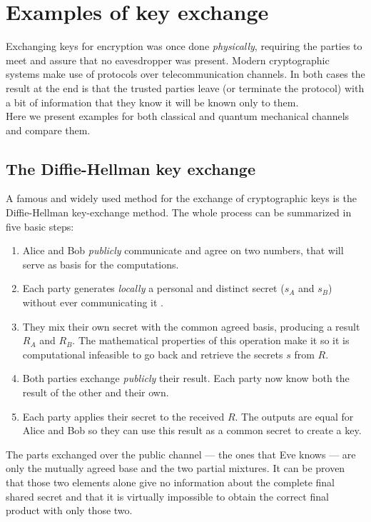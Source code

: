 \section{Examples of key exchange}
	Exchanging keys for encryption was once done \textit{physically}, requiring the parties to meet and assure that no eavesdropper was present.
	Modern cryptographic systems make use of protocols over telecommunication channels. 
	In both cases the result at the end is that the trusted parties leave (or terminate the protocol) with a bit of information that they know it will be known only to them.\\
	Here we present examples for both classical and quantum mechanical channels and compare them.
		\subsection{The Diffie-Hellman key exchange}
	
		A famous and widely used method for the exchange of cryptographic keys is the Diffie-Hellman key-exchange method.
	The whole process can be summarized in five basic steps:
	\begin{enumerate}
		\item Alice and Bob \emph{publicly} communicate and agree on two numbers, that will serve as basis for the computations.
		\item Each party generates \emph{locally} a personal and distinct secret ($s_A$ and $s_B$) without ever communicating it .
		\item They mix their own secret with the common agreed basis, producing a result $R_A$ and $R_B$. The mathematical properties of this operation make it so it is computational infeasible to go back and retrieve the secrets $s$ from $R$.
		\item Both parties exchange \emph{publicly} their result. Each party now know both the result of the other and their own.
		\item Each party applies their secret to the received $R$. The outputs are equal for Alice and Bob so they can use this result as a common secret to create a key.
	\end{enumerate}	 
	
	The parts exchanged over the public channel --- the ones that Eve knows --- are only the mutually agreed base and the two partial mixtures. 
	It can be proven that those two elements alone give no information about the complete final shared secret and that it is virtually impossible to obtain the correct final product with only those two.\\  
	
